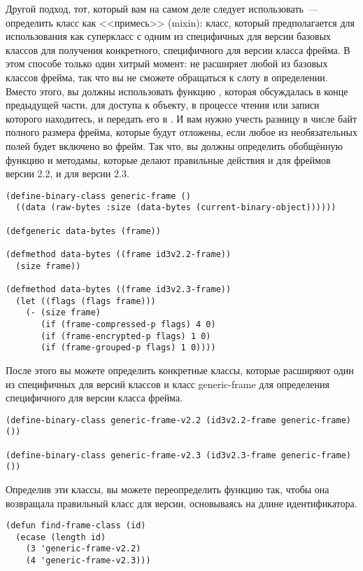 Другой подход, тот, который вам на самом деле следует использовать~--- определить класс
 как <<примесь>> (mixin): класс, который предполагается для
использования как суперкласс с одним из специфичных для версии базовых классов для
получения конкретного, специфичного для версии класса фрейма. В этом способе только один
хитрый момент:  не расширяет любой из базовых классов фрейма, так что
вы не сможете обращаться к слоту  в определении. Вместо этого, вы должны
использовать функцию , которая обсуждалась в конце предыдущей
части, для доступа к объекту, в процессе чтения или записи которого находитесь, и передать
его в . И вам нужно учесть разницу в числе байт полного размера фрейма, которые
будут отложены, если любое из необязательных полей будет включено во фрейм. Так что, вы
должны определить обобщённую функцию  и методамы, которые делают
правильные действия и для фреймов версии 2.2, и для версии 2.3.

\begin{lstlisting}
(define-binary-class generic-frame ()
  ((data (raw-bytes :size (data-bytes (current-binary-object))))))

(defgeneric data-bytes (frame))

(defmethod data-bytes ((frame id3v2.2-frame))
  (size frame))

(defmethod data-bytes ((frame id3v2.3-frame))
  (let ((flags (flags frame)))
    (- (size frame)
       (if (frame-compressed-p flags) 4 0)
       (if (frame-encrypted-p flags) 1 0)
       (if (frame-grouped-p flags) 1 0))))
\end{lstlisting}

После этого вы можете определить конкретные классы, которые расширяют один из специфичных
для версий классов и класс generic-frame для определения специфичного для версии класса
фрейма.

\begin{lstlisting}
(define-binary-class generic-frame-v2.2 (id3v2.2-frame generic-frame) ())

(define-binary-class generic-frame-v2.3 (id3v2.3-frame generic-frame) ())
\end{lstlisting}

Определив эти классы, вы можете переопределить функцию  так, чтобы
она возвращала правильный класс для версии, основываясь на длине идентификатора.

\begin{lstlisting}
(defun find-frame-class (id)
  (ecase (length id)
    (3 'generic-frame-v2.2)
    (4 'generic-frame-v2.3)))
\end{lstlisting}


